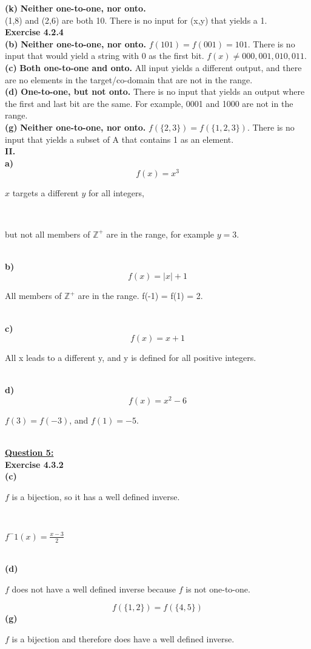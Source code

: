 \documentclass[12pt, letterpaper, twoside]{article}
\begin{document}
\break
\textbf{(k)} \textbf{Neither one-to-one, nor onto.}\\ (1,8) and (2,6) are both 10. There is no input for (x,y) that yields a 1.\\
\break
\break
\textbf{Exercise 4.2.4}\\
\textbf{(b)} \textbf{Neither one-to-one, nor onto.} $f(101) = f(001) = 101$. There is no input that would yield a string with 0 as the first bit. $f(x) \neq 000, 001, 010, 011$.\\
\break
\textbf{(c)} \textbf{Both one-to-one and onto.} All input yields a different output, and there are no elements in the target/co-domain that are not in the range.\\
\break
\textbf{(d)} \textbf{One-to-one, but not onto.} There is no input that yields an output where the first and last bit are the same. For example, 0001 and 1000 are not in the range.\\
\break
\textbf{(g)} \textbf{Neither one-to-one, nor onto.} $f(\{2, 3\}) = f(\{1, 2, 3\})$. There is no input that yields a subset of A that contains 1 as an element.\\
\break
\noindent \textbf{II.}\\
\textbf{a)} \[f(x) = x^3\]
\centerline{$x$ targets a different $y$ for all integers,} \\
\centerline{but not all members of $\mathbb{Z}^+$ are in the range, for example $y = 3$.}\\
\break
\textbf{b)} \[f(x) = |x| + 1\]
\centerline{All members of $\mathbb{Z}^+$ are in the range. f(-1) = f(1) = 2.}\\
\break
\textbf{c)} \[f(x) = x + 1\]
\centerline{All x leads to a different y, and y is defined for all positive integers.}\\
\break
\textbf{d)} \[f(x) = x^2 - 6\]
\centerline{$f(3) = f(-3)$, and $f(1) = -5$.}\\
\break
\newpage
\noindent \textbf{\underline{Question 5:}}\\
\textbf{Exercise 4.3.2}\\
\textbf{(c)}\\
\centerline{$f$ is a bijection, so it has a well defined inverse.}\\
\centerline{$f^-1 (x) = \frac{x - 3}{2}$}\\
\break
\textbf{(d)}\\
\centerline{$f$ does not have a well defined inverse because $f$ is not one-to-one.}
\[f(\{1, 2\}) = f(\{4, 5\})\]
\textbf{(g)}\\
\centerline{$f$ is a bijection and therefore does have a well defined inverse.}\\
\end{document}
